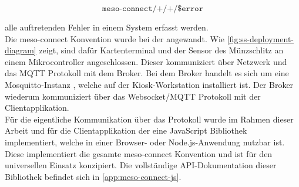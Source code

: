 \[\texttt{meso-connect/+/+/\$error} \]

alle auftretenden Fehler in einem System erfasst werden.\\

Die meso-connect Konvention wurde bei der \shst{} angewandt. Wie \autoref{fig:ss-deployment-diagram} zeigt,
sind dafür Kartenterminal und der Sensor des Münzschlitz an einem Mikrocontroller angeschlossen. Dieser
kommuniziert über Netzwerk und das MQTT Protokoll mit dem Broker. Bei dem Broker handelt es sich um 
eine Mosquitto-Instanz \cite{mosquitto}, welche auf der Kiosk-Workstation installiert ist. 
Der Broker wiederum kommuniziert über das Websocket/MQTT Protokoll
mit der Clientapplikation.\\
Für die eigentliche Kommunikation über das Protokoll wurde im Rahmen dieser Arbeit und für die Clientapplikation 
der \shst{} eine JavaScript Bibliothek implementiert, welche in einer Browser- oder Node.js-Anwendung
nutzbar ist. Diese implementiert die gesamte meso-connect Konvention und ist für den universellen Einsatz
konzipiert. Die vollständige API-Dokumentation dieser Bibliothek befindet sich in \autoref{app:meso-connect-js}.

\iffalse
- Kartenterminal und der Sensor des Münzschlitz sind an einen Mikrocontroller angeschlossen. 
- Mikrocontroller kommuniziert über Netzwerk und das MQTT Protokoll mit dem Broker
- Broker ist ein Softwareservice welcher auf der Workstation läuft
- Die Clientapplikation kommuniziert über das MQTT/Websocket Protokoll mit dem Broker
- Konfigurationsfile, Beispiel der JS Bib 
- JS API Dokumentation in den Anhang
\fi